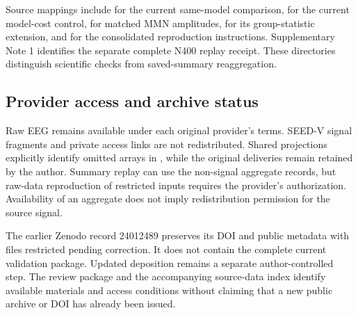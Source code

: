 Source mappings include  for the current same-model comparison,  for the current model-cost control,  for matched MMN amplitudes,  for its group-statistic extension, and  for the consolidated reproduction instructions. Supplementary Note 1 identifies the separate complete N400 replay receipt. These directories distinguish scientific checks from saved-summary reaggregation.

\subsection*{Provider access and archive status}
Raw EEG remains available under each original provider's terms. SEED-V signal fragments and private access links are not redistributed. Shared projections explicitly identify omitted arrays in , while the original deliveries remain retained by the author. Summary replay can use the non-signal aggregate records, but raw-data reproduction of restricted inputs requires the provider's authorization. Availability of an aggregate does not imply redistribution permission for the source signal.

The earlier Zenodo record 24012489 preserves its DOI and public metadata with files restricted pending correction. It does not contain the complete current validation package. Updated deposition remains a separate author-controlled step. The review package and the accompanying source-data index identify available materials and access conditions without claiming that a new public archive or DOI has already been issued.

